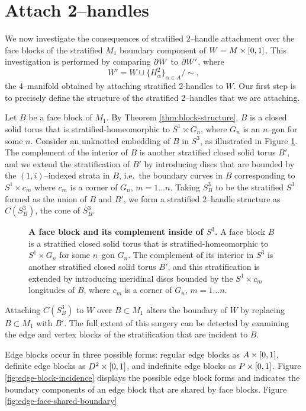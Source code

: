 \section{Attach 2--handles}

We now investigate the consequences of stratified 2--handle attachment over the face blocks of the stratified $M_1$ boundary component of $W=M\times[0,1]$.
This investigation is performed by comparing $\partial W$ to $\partial W'$, where
\[
	W' = W\cup\{H_\alpha^2\}_{\alpha\in A} / \sim,
\]
the 4--manifold obtained by attaching stratified 2-handles to $W$.
Our first step is to precisely define the structure of the stratified 2--handles that we are attaching.

Let $B$ be a face block of $M_1$.
By Theorem \ref{thm:block-structure}, $B$ is a closed solid torus that is stratified-homeomorphic to $S^1\times G_n$, where $G_n$ is an $n$--gon for some $n$.
Consider an unknotted embedding of $B$ in $S^3$, as illustrated in Figure \ref{fig:face-block-complement}.
The complement of the interior of $B$ is another stratified closed solid torus $B'$, and we extend the stratification of $B'$ by introducing discs that are bounded by the $(1,i)$--indexed strata in $B$, i.e.\ the boundary curves in $B$ corresponding to $S^1\times c_m$ where $c_m$ is a corner of $G_n$, $m=1\dots n$.
Taking $S_B^3$ to be the stratified $S^3$ formed as the union of $B$ and $B'$, we form a stratified 2--handle structure as $C(S_B^3)$, the cone of $S_B^3$.

\begin{figure}[h!]
	\caption{
		\textbf{A face block and its complement inside of $S^3$.}
		A face block $B$ is a stratified closed solid torus that is stratified-homeomorphic to $S^1\times G_n$ for some $n$--gon $G_n$.
		The complement of its interior in $S^3$ is another stratified closed solid torus $B'$, and this stratification is extended by introducing meridinal discs bounded by the $S^1\times c_m$ longitudes of $B$, where $c_m$ is a corner of $G_n$, $m=1\dots n$.
	}
	\label{fig:face-block-complement}
\end{figure}

Attaching $C(S_B^3)$ to $W$ over $B\subset M_1$ alters the boundary of $W$ by replacing $B\subset M_1$ with $B'$.
The full extent of this surgery can be detected by examining the edge and vertex blocks of the stratification that are incident to $B$.

Edge blocks occur in three possible forms: regular edge blocks as $A\times[0,1]$, definite edge blocks as $D^2\times[0,1]$, and indefinite edge blocks as $P\times[0,1]$.
Figure \ref{fig:edge-block-incidence} displays the possible edge block forms and indicates the boundary components of an edge block that are shared by face blocks.
Figure \ref{fig:edge-face-shared-boundary}

